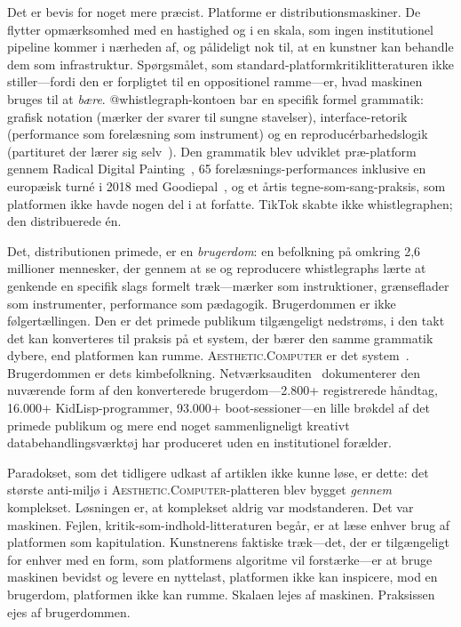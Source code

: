 \documentclass[10pt,letterpaper,twocolumn]{article}
\newcommand{\ac}{\textsc{Aesthetic.Computer}}
\begin{document}
Det er bevis for noget mere præcist. Platforme er distributionsmaskiner. De flytter opmærksomhed med en hastighed og i en skala, som ingen institutionel pipeline kommer i nærheden af, og pålideligt nok til, at en kunstner kan behandle dem som infrastruktur. Spørgsmålet, som standard-platformkritiklitteraturen ikke stiller---fordi den er forpligtet til en oppositionel ramme---er, hvad maskinen bruges til at \emph{bære}. @whistlegraph-kontoen bar en specifik formel grammatik: grafisk notation (mærker der svarer til sungne stavelser), interface-retorik (performance som forelæsning som instrument) og en reproducérbarhedslogik (partituret der lærer sig selv~\citep{scudder2026whistlegraph}). Den grammatik blev udviklet præ-platform gennem Radical Digital Painting~\citep{scudder2017manifesto, scudder2018rdp35c3}, 65 forelæsnings-performances inklusive en europæisk turné i 2018 med Goodiepal~\citep{scudder2026goodiepal}, og et årtis tegne-som-sang-praksis, som platformen ikke havde nogen del i at forfatte. TikTok skabte ikke whistlegraphen; den distribuerede én.

Det, distributionen primede, er en \emph{brugerdom}: en befolkning på omkring 2,6 millioner mennesker, der gennem at se og reproducere whistlegraphs lærte at genkende en specifik slags formelt træk---mærker som instruktioner, grænseflader som instrumenter, performance som pædagogik. Brugerdommen er ikke følgertællingen. Den er det primede publikum tilgængeligt nedstrøms, i den takt det kan konverteres til praksis på et system, der bærer den samme grammatik dybere, end platformen kan rumme. \ac{} er det system~\citep{scudder2026ac}. Brugerdommen er dets kimbefolkning. Netværksauditen~\citep{scudder2026audit} dokumenterer den nuværende form af den konverterede brugerdom---2.800+ registrerede håndtag, 16.000+ KidLisp-programmer, 93.000+ boot-sessioner---en lille brøkdel af det primede publikum og mere end noget sammenligneligt kreativt databehandlingsværktøj har produceret uden en institutionel forælder.

Paradokset, som det tidligere udkast af artiklen ikke kunne løse, er dette: det største anti-miljø i \ac{}-platteren blev bygget \emph{gennem} komplekset. Løsningen er, at komplekset aldrig var modstanderen. Det var maskinen. Fejlen, kritik-som-indhold-litteraturen begår, er at læse enhver brug af platformen som kapitulation. Kunstnerens faktiske træk---det, der er tilgængeligt for enhver med en form, som platformens algoritme vil forstærke---er at bruge maskinen bevidst og levere en nyttelast, platformen ikke kan inspicere, mod en brugerdom, platformen ikke kan rumme. Skalaen lejes af maskinen. Praksissen ejes af brugerdommen.
\end{document}
